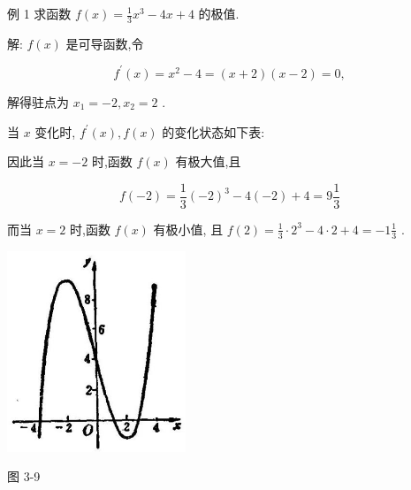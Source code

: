 \documentclass[lang=cn,newtx,10pt,scheme=chinese]{elegantbook}
\begin{document}
例 1 求函数 \(f\left( x\right) = \frac{1}{3}{x}^{3} - {4x} + 4\) 的极值.

解: \(f\left( x\right)\) 是可导函数,令

\[
{f}^{\prime }\left( x\right) = {x}^{2} - 4 = \left( {x + 2}\right) \left( {x - 2}\right) = 0,
\]

解得驻点为 \({x}_{1} = - 2,{x}_{2} = 2\) .

当 \(x\) 变化时, \({f}^{\prime }\left( x\right) ,f\left( x\right)\) 的变化状态如下表:

\begin{center}
\end{center}

因此当 \(x = - 2\) 时,函数 \(f\left( x\right)\) 有极大值,且

\[
f\left( {-2}\right) = \frac{1}{3}{\left( -2\right) }^{3} - 4\left( {-2}\right) + 4 = 9\frac{1}{3}
\]

而当 \(x = 2\) 时,函数 \(f\left( x\right)\) 有极小值, 且 \(f\left( 2\right) = \frac{1}{3} \cdot {2}^{3} - 4 \cdot 2 + 4 = - 1\frac{1}{3}\) .

\begin{center}
\includegraphics[max width=0.4\textwidth]{images/01912c18-5c3f-733d-b775-749ba9897a9d_143_629914.jpg}
\end{center}

图 3-9
\end{document}
